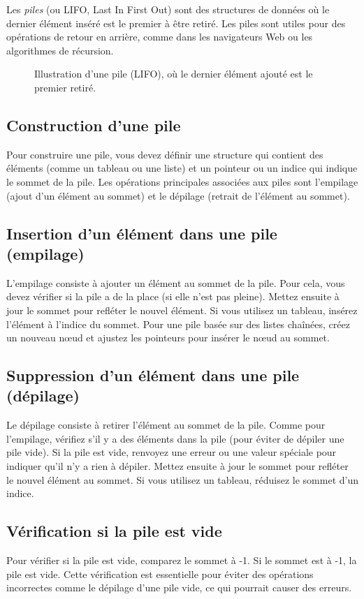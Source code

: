Les \emph{piles} (ou LIFO, Last In First Out) sont des structures de données où le dernier élément inséré est le premier à être retiré. Les piles sont utiles pour des opérations de retour en arrière, comme dans les navigateurs Web ou les algorithmes de récursion.

\begin{figure}[H]
	\centering
	\caption{Illustration d'une pile (LIFO), où le dernier élément ajouté est le premier retiré.}
\end{figure}

\subsection{Construction d'une pile}
Pour construire une pile, vous devez définir une structure qui contient des éléments (comme un tableau ou une liste) et un pointeur ou un indice qui indique le sommet de la pile. Les opérations principales associées aux piles sont l'empilage (ajout d'un élément au sommet) et le dépilage (retrait de l'élément au sommet).

\subsection{Insertion d'un élément dans une pile (empilage)}
L'empilage consiste à ajouter un élément au sommet de la pile. Pour cela, vous devez vérifier si la pile a de la place (si elle n'est pas pleine). Mettez ensuite à jour le sommet pour refléter le nouvel élément. Si vous utilisez un tableau, insérez l'élément à l'indice du sommet. Pour une pile basée sur des listes chaînées, créez un nouveau nœud et ajustez les pointeurs pour insérer le nœud au sommet.

\subsection{Suppression d'un élément dans une pile (dépilage)}
Le dépilage consiste à retirer l'élément au sommet de la pile. Comme pour l'empilage, vérifiez s'il y a des éléments dans la pile (pour éviter de dépiler une pile vide). Si la pile est vide, renvoyez une erreur ou une valeur spéciale pour indiquer qu'il n'y a rien à dépiler. Mettez ensuite à jour le sommet pour refléter le nouvel élément au sommet. Si vous utilisez un tableau, réduisez le sommet d'un indice.

\subsection{Vérification si la pile est vide}
Pour vérifier si la pile est vide, comparez le sommet à -1. Si le sommet est à -1, la pile est vide. Cette vérification est essentielle pour éviter des opérations incorrectes comme le dépilage d'une pile vide, ce qui pourrait causer des erreurs.

